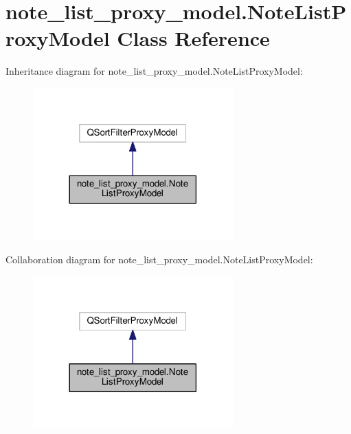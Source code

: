 \hypertarget{classnote__list__proxy__model_1_1_note_list_proxy_model}{}\section{note\+\_\+list\+\_\+proxy\+\_\+model.\+Note\+List\+Proxy\+Model Class Reference}
\label{classnote__list__proxy__model_1_1_note_list_proxy_model}


Inheritance diagram for note\+\_\+list\+\_\+proxy\+\_\+model.\+Note\+List\+Proxy\+Model\+:\nopagebreak
\begin{figure}[H]
\begin{center}
\leavevmode
\includegraphics[width=218pt]{classnote__list__proxy__model_1_1_note_list_proxy_model__inherit__graph}
\end{center}
\end{figure}


Collaboration diagram for note\+\_\+list\+\_\+proxy\+\_\+model.\+Note\+List\+Proxy\+Model\+:\nopagebreak
\begin{figure}[H]
\begin{center}
\leavevmode
\includegraphics[width=218pt]{classnote__list__proxy__model_1_1_note_list_proxy_model__coll__graph}
\end{center}
\end{figure}
